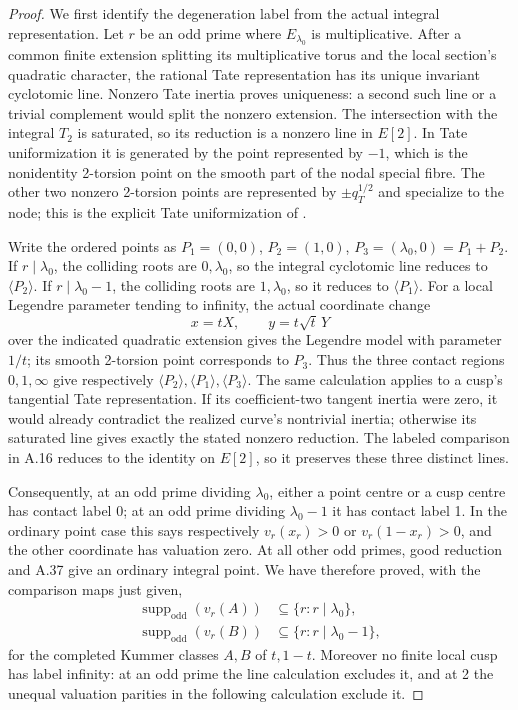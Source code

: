 \begin{proof}
We first identify the degeneration label from the actual integral
representation.  Let $r$ be an odd prime where $E_{\lambda_0}$ is
multiplicative.  After a common finite extension splitting its
multiplicative torus and the local section's quadratic character,
the rational Tate representation has its unique invariant
cyclotomic line.  Nonzero Tate inertia proves uniqueness: a second
such line or a trivial complement would split the nonzero
extension.  The intersection with the integral $T_2$ is saturated,
so its reduction is a nonzero line in $E[2]$.  In Tate
uniformization it is generated by the point represented by $-1$,
which is the nonidentity 2-torsion point on the smooth part of the
nodal special fibre.  The other two nonzero 2-torsion points are
represented by $\pm q_T^{1/2}$ and specialize to the node; this is
the explicit Tate uniformization of \cite[\S19]{LegIovitaMasdeu2009}.

Write the ordered points as $P_1=(0,0)$, $P_2=(1,0)$,
$P_3=(\lambda_0,0)=P_1+P_2$.  If $r\mid\lambda_0$, the colliding
roots are $0,\lambda_0$, so the integral cyclotomic line reduces to
$\langle P_2\rangle$.  If $r\mid\lambda_0-1$, the colliding roots
are $1,\lambda_0$, so it reduces to $\langle P_1\rangle$.
For a local Legendre parameter tending to infinity, the actual
coordinate change
\[
                x=tX,\qquad y=t\sqrt t\,Y
\tag{A.41.1}
\]
over the indicated quadratic extension gives the Legendre model
with parameter $1/t$; its smooth 2-torsion point corresponds to
$P_3$.  Thus the three contact regions $0,1,\infty$ give respectively
$\langle P_2\rangle,\langle P_1\rangle,\langle P_3\rangle$.
The same calculation applies to a cusp's tangential Tate
representation.  If its coefficient-two tangent inertia were zero,
it would already contradict the realized curve's nontrivial
inertia; otherwise its saturated line gives exactly the stated
nonzero reduction.  The labeled comparison in A.16 reduces to the
identity on $E[2]$, so it preserves these three distinct lines.

Consequently, at an odd prime dividing $\lambda_0$, either a point
centre or a cusp centre has contact label 0; at an odd prime dividing
$\lambda_0-1$ it has contact label 1.  In the ordinary point case
this says respectively $v_r(x_r)>0$ or $v_r(1-x_r)>0$, and the
other coordinate has valuation zero.  At all other odd primes,
good reduction and A.37 give an ordinary integral point.  We have
therefore proved, with the comparison maps just given,
\[
 \begin{split}
  \operatorname{supp}_{\mathrm{odd}}(v_r(A))
     &\subseteq\{r:r\mid\lambda_0\},\\
  \operatorname{supp}_{\mathrm{odd}}(v_r(B))
     &\subseteq\{r:r\mid\lambda_0-1\},
 \end{split}
\tag{A.41.2}
\]
for the completed Kummer classes $A,B$ of $t,1-t$.  Moreover no
finite local cusp has label infinity: at an odd prime the line
calculation excludes it, and at 2 the unequal valuation parities
in the following calculation exclude it.


\end{proof}
